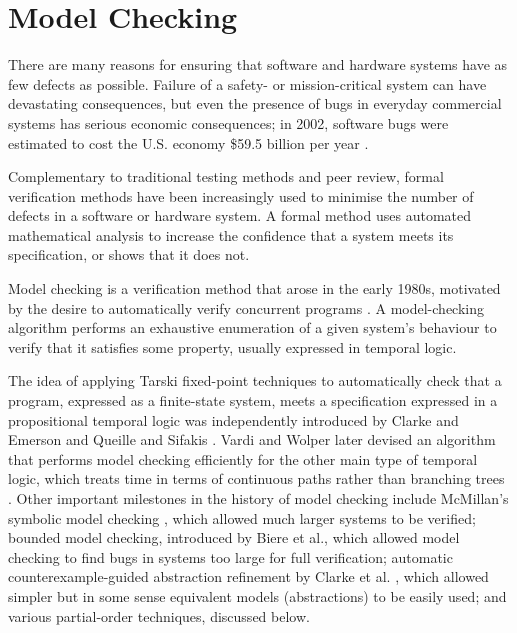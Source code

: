 \documentclass[12pt,a4paper,twoside,openright]{report}
\begin{document}
\section{Model Checking}

There are many reasons for ensuring that
software and hardware systems have as
few defects as possible. Failure of a
safety- or mission-critical system can
have devastating consequences, but even the
presence of bugs in everyday commercial systems has
serious economic consequences; in 2002,
software bugs were estimated to cost
the U.S. economy \$59.5 billion per year \cite{tass02}.

Complementary to traditional testing methods
and peer review, formal verification methods have been
increasingly used
to minimise the number of defects in a
software or hardware system. A formal
method uses automated
mathematical analysis to increase
the confidence that a system meets its
specification, or shows that it does not.

Model checking is a verification method
that arose in the early 1980s,
motivated by the desire to automatically
verify concurrent programs \cite{cla08}.
A model-checking algorithm performs
an exhaustive enumeration of a given
system's behaviour to verify that it
satisfies some property, usually
expressed in temporal logic.

The idea of applying Tarski
fixed-point techniques \cite{tar55}
to automatically check that a
program, expressed as a finite-state
system, meets a specification
expressed in a propositional
temporal logic was independently introduced
by Clarke and Emerson \cite{cla82} and
Queille and Sifakis \cite{que82}. Vardi and
Wolper later devised an algorithm that
performs model checking efficiently
for the other main type of temporal
logic, which treats time in terms
of continuous paths rather than branching
trees \cite{var96}.
Other important
milestones in the history of model
checking include McMillan's
symbolic model checking \cite{mcm93},
which allowed much larger
systems to be verified;
bounded model checking, introduced by
Biere et al.\@ \cite{bie99},
which allowed model checking
to find bugs in systems too large for full
verification; automatic counterexample-guided
abstraction refinement by Clarke et al.\@
\cite{cla00}, which allowed simpler but
in some sense equivalent models
(abstractions) to be easily used; and
various partial-order techniques, discussed
below.
\end{document}

